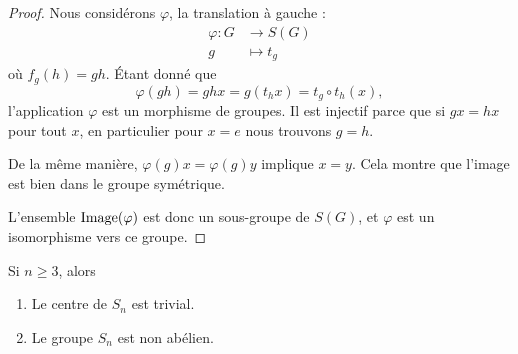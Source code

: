 \begin{proof}
    Nous considérons \( \varphi\), la translation à gauche :
    \begin{equation}
        \begin{aligned}
            \varphi\colon G&\to S(G) \\
            g&\mapsto t_g
        \end{aligned}
    \end{equation}
    où \( f_g(h)=gh\). Étant donné que
    \begin{equation}
        \varphi(gh)= ghx=g(t_hx)=t_g\circ t_h(x),
    \end{equation}
    l'application \( \varphi\) est un morphisme de groupes. Il est injectif parce que si \( gx=hx\) pour tout \( x\), en particulier pour \( x=e\) nous trouvons \( g=h\).

    De la même manière, \( \varphi(g)x=\varphi(g)y\) implique \( x=y\). Cela montre que l'image est bien dans le groupe symétrique.

    L'ensemble \( \operatorname{Image}(\varphi)\) est donc un sous-groupe de \( S(G)\), et \( \varphi\) est un isomorphisme vers ce groupe.
\end{proof}

\begin{lemma}       \label{LEMooMVUGooRiDaDz}
    Si \( n\geq 3\), alors
    \begin{enumerate}
        \item
            Le centre de \( S_n\) est trivial.
        \item
            Le groupe \( S_n\) est non abélien.
    \end{enumerate}
\end{lemma}

